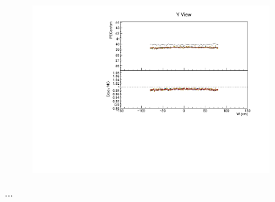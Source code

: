 \documentclass[12pt,a4paper]{article}
\begin{document}
\begin{figure}[!ht]
\begin{subfigure}{0.5\textwidth}
  \end{subfigure}
  \begin{subfigure}{0.5\textwidth}
    \includegraphics[width=\linewidth]{essentialsec_tb/pecorrcm_w_y.pdf}
  \end{subfigure}
  \caption{...}
  \label{figAbsCalibW1}
\end{figure}
\end{document}
